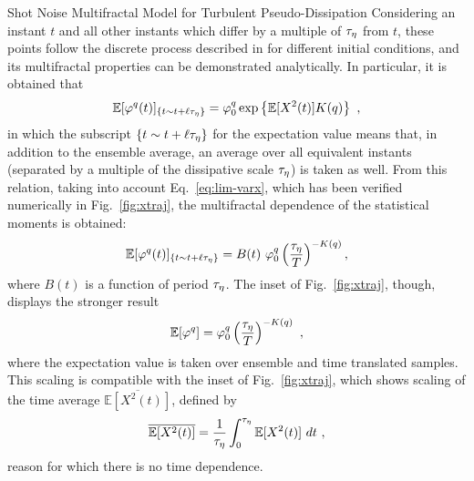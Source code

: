 \begin{chapter}{Shot Noise Multifractal Model for Turbulent Pseudo-Dissipation}
Considering an instant $t$ and all other instants which differ by a multiple of $\tau_{\eta}$ from $t$, these points follow the discrete process described in \textcite{perpete2011} for different initial conditions, and its multifractal properties can be demonstrated analytically. In particular, it is obtained that
\begin{equation} \label{eq:phi-mom-periodic}
    \mathbb{E} [ \varphi^q(t) ]_{\{t \sim t+\ell\tau_{\eta}\}} = \varphi_0^q \exp \left\{ \mathbb{E}[X^2(t)] K(q) \right\} \ ,
\end{equation}
in which the subscript $\{t \sim t+\ell\tau_{\eta}\}$ for the expectation value means that, in addition to the ensemble average, an average over all equivalent instants (separated by a multiple of the dissipative scale $\tau_{\eta}$) is taken as well. From this relation, taking into account Eq.~\eqref{eq:lim-varx}, which has been verified numerically in Fig.~\ref{fig:xtraj}, the multifractal dependence of the statistical moments is obtained:
\begin{equation}
    \mathbb{E} [ \varphi^q(t) ]_{\{t \sim t+\ell\tau_{\eta}\}} = B(t) \ \varphi_0^q \left( \frac{\tau_{\eta}}{T} \right)^{-K(q)} ,
\end{equation}
where $B(t)$ is a function of period $\tau_{\eta}$.
The inset of Fig.~\ref{fig:xtraj}, though, displays the stronger result
\begin{equation} \label{eq:moments-multifrac}
    \mathbb{E} [ \varphi^q ] = \varphi_0^q \left( \frac{\tau_{\eta}}{T} \right)^{-K(q)} \ ,
\end{equation}
where the expectation value is taken over ensemble and time translated samples. This scaling is compatible with the inset of Fig.~\ref{fig:xtraj}, which shows scaling of the time average $\overline{\mathbb{E}[X^2(t)]}$, defined by
\begin{equation} \label{eq:x2-varmean}
    \overline{\mathbb{E}[X^2(t)]} = \frac{1}{\tau_{\eta}} \int_0^{\tau_{\eta}} \mathbb{E}[X^2(t)] \ dt \ ,
\end{equation}
reason for which there is no time dependence.


\end{chapter}
